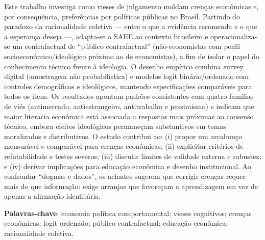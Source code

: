
\setlength{\absparsep}{18pt} %
\begin{resumo}
    Este trabalho investiga como vieses de julgamento moldam crenças econômicas e, por consequência, preferências por políticas públicas no Brasil. Partindo do paradoxo da racionalidade coletiva — entre o que a evidência recomenda e o que a esperança deseja —, adapta-se a SAEE ao contexto brasileiro e operacionaliza-se um contrafactual de “público contrafactual” (não-economistas com perfil socioeconômico/ideológico próximo ao de economistas), a fim de isolar o papel do conhecimento técnico frente à ideologia. O desenho empírico combina survey digital (amostragem não probabilística) e modelos logit binário/ordenado com controles demográficos e ideológicos, mantendo especificações comparáveis para todos os itens. Os resultados apontam padrões consistentes com quatro famílias de viés (antimercado, antiestrangeiro, antitrabalho e pessimismo) e indicam que maior literacia econômica está associada a respostas mais próximas ao consenso técnico, embora efeitos ideológicos permaneçam substantivos em temas moralizados e distributivos. O estudo contribui ao: (i) propor um arcabouço mensurável e comparável para crenças econômicas; (ii) explicitar critérios de refutabilidade e testes severos; (iii) discutir limites de validade externa e robustez; e (iv) derivar implicações para educação econômica e desenho institucional. Ao confrontar “dogmas e dados”, os achados sugerem que corrigir crenças requer mais do que informação: exige arranjos que favoreçam a aprendizagem em vez de apenas a afirmação identitária.

 \textbf{Palavras-chave}: economia política comportamental; vieses cognitivos; crenças econômicas; logit ordenado; público contrafactual; educação econômica; racionalidade coletiva.
\end{resumo}
